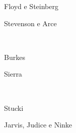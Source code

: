\begin{subfigure}{0.27\textwidth}
    \centering
    
    \caption{Floyd e Steinberg}
\end{subfigure}%
\begin{subfigure}{0.63\textwidth}
    \centering
    
    \caption{Stevenson e Arce}
\end{subfigure}\\[8pt]
\begin{subfigure}{0.45\textwidth}
    \centering
    
    \caption{Burkes}
\end{subfigure}%
\begin{subfigure}{0.45\textwidth}
    \centering
    
    \caption{Sierra}
\end{subfigure}\\[8pt]
\begin{subfigure}{0.45\textwidth}
    \centering
    
    \caption{Stucki}
\end{subfigure}%
\begin{subfigure}{0.45\textwidth}
    \centering
    
    \caption{Jarvis, Judice e Ninke}
\end{subfigure}